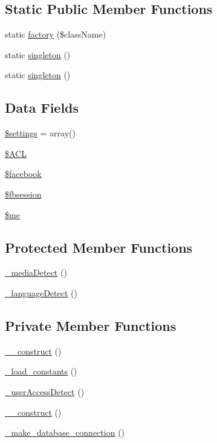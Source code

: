 \subsection*{Static Public Member Functions}
\begin{DoxyCompactItemize}
\item 
static \hyperlink{classImpact__Base_a8c0508f1ea0fe72c8d0e6e8dd2a1c41c}{factory} (\$className)
\item 
static \hyperlink{classImpact__Base_af527068985bac6010736b5959643eda7}{singleton} ()
\item 
static \hyperlink{classImpact__Base_af527068985bac6010736b5959643eda7}{singleton} ()
\end{DoxyCompactItemize}
\subsection*{Data Fields}
\begin{DoxyCompactItemize}
\item 
\hyperlink{classImpact__Base_ac7c3353107070daa85f641882931b358}{\$settings} = array()
\item 
\hyperlink{classImpact__Base_a0e6e927aed984ad8947f77bf803b70bb}{\$ACL}
\item 
\hyperlink{classImpact__Base_a4b9bb5e9f7a5ea9381bdbe31c44e9339}{\$facebook}
\item 
\hyperlink{classImpact__Base_a92c4441a7b5fe8069992f5a4a29f24fe}{\$fbsession}
\item 
\hyperlink{classImpact__Base_ad856a60cee1894f180e845f9b7b81458}{\$me}
\end{DoxyCompactItemize}
\subsection*{Protected Member Functions}
\begin{DoxyCompactItemize}
\item 
\hyperlink{classImpact__Base_a36245233fa9d0fbb0a71e2a985e79c72}{\_\-mediaDetect} ()
\item 
\hyperlink{classImpact__Base_a06e0d9a42275d91e76f877af01c9b0de}{\_\-languageDetect} ()
\end{DoxyCompactItemize}
\subsection*{Private Member Functions}
\begin{DoxyCompactItemize}
\item 
\hyperlink{classImpact__Base_a095c5d389db211932136b53f25f39685}{\_\-\_\-construct} ()
\item 
\hyperlink{classImpact__Base_a2c7019c3058ec100b498ed14dd2c4d23}{\_\-load\_\-constants} ()
\item 
\hyperlink{classImpact__Base_a6e7a5edea355b304f86d731e4d57dc84}{\_\-userAccessDetect} ()
\item 
\hyperlink{classImpact__Base_a095c5d389db211932136b53f25f39685}{\_\-\_\-construct} ()
\item 
\hyperlink{classImpact__Base_a16870e7c667f514a099afacc1009252b}{\_\-make\_\-database\_\-connection} ()
\end{DoxyCompactItemize}
